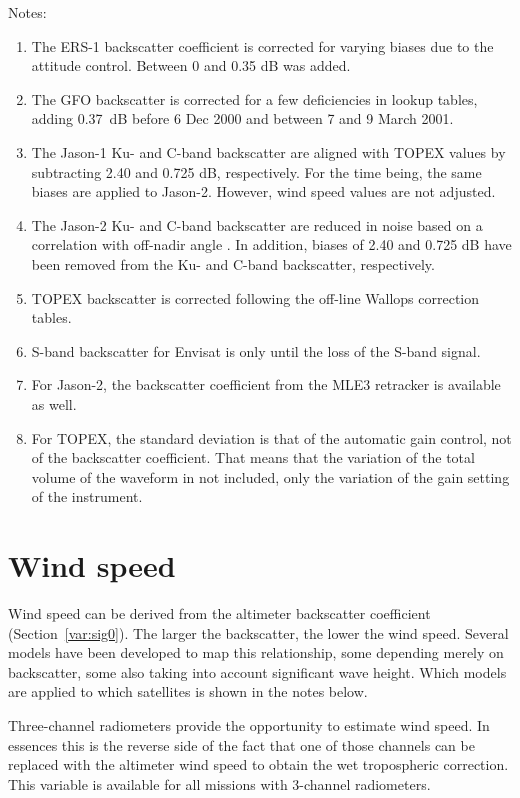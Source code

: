 \documentclass[a4paper,11pt,openany,natbib]{thesis}
\begin{document}
Notes:
\begin{enumerate}
\item The ERS-1 backscatter coefficient is corrected for varying biases due to the attitude control. Between 0 and 0.35 dB was added.\label{item:sig0_e1}
\item The GFO backscatter is corrected for a few deficiencies in lookup tables, adding 0.37~dB before 6 Dec 2000 and between 7 and 9 March 2001.\label{item:sig0_g1}
\item The Jason-1 Ku- and C-band backscatter are aligned with TOPEX values by subtracting 2.40 and 0.725 dB, respectively. For the time being, the same biases are applied to Jason-2. However, wind speed values are not adjusted.\label{item:sig0_j1}
\item The Jason-2 Ku- and C-band backscatter are reduced in noise based on a correlation with off-nadir angle \citep{quartly2009a}. In addition, biases of 2.40 and 0.725 dB have been removed from the Ku- and C-band backscatter, respectively.\label{item:sig0_j2}
\item TOPEX backscatter is corrected following the off-line Wallops correction tables.\label{item:sig0_tx}
\item S-band backscatter for Envisat is only until the loss of the S-band signal.\label{item:sig0_n1}
\item For Jason-2, the backscatter coefficient from the MLE3 retracker is available as well.\label{item:sig0_ku_mle3}
\item For TOPEX, the standard deviation is that of the automatic gain control, not of the backscatter coefficient. That means that the variation of the total volume of the waveform in not included, only the variation of the gain setting of the instrument.\label{item:sig0_rms_tx}
\end{enumerate}

\section{Wind speed}
\label{var:wind}
Wind speed can be derived from the altimeter backscatter coefficient (Section~\ref{var:sig0}). The larger the backscatter, the lower the wind speed. Several models have been developed to map this relationship, some depending merely on backscatter, some also taking into account significant wave height. Which models are applied to which satellites is shown in the notes below.

Three-channel radiometers provide the opportunity to estimate wind speed. In essences this is the reverse side of the fact that one of those channels can be replaced with the altimeter wind speed to obtain the wet tropospheric correction. This variable is available for all missions with 3-channel radiometers.
\end{document}
